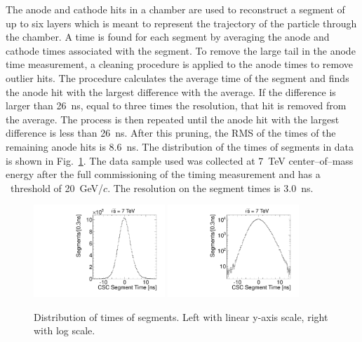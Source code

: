 The anode and cathode hits in a chamber are used to reconstruct a segment of up to six layers which is meant to represent the trajectory of the particle through the chamber.
A time is found for each segment by averaging the anode and cathode times associated with the segment. 
To remove the large tail in the anode time measurement,
a cleaning procedure is applied to the anode times to remove outlier hits. The procedure calculates the average time of the segment and finds the anode hit with the largest
difference with the average. If the difference is larger than 26~ns, equal to three times the resolution,
that hit is removed from the average. The process is then repeated until the
anode hit with the largest difference is less than 26~ns.
After this pruning, the RMS of the times of the remaining anode hits is 8.6~ns.
The distribution of the times of segments in data is shown in Fig.~\ref{fig:SegTimes}. 
The data sample used was collected at 7~TeV center--of--mass energy after the full commissioning of the timing measurement and has a \pt\ threshold of 20~GeV/$c$.
The resolution on the segment times is 3.0~ns.

\begin{figure}
  \begin{center}
      \includegraphics[width=0.44\textwidth]{figures/timing/StripAndWireSegmentTime}
      \includegraphics[width=0.44\textwidth]{figures/timing/StripAndWireSegmentTimeLog}
      \caption[Distribution of times of segments.]
      {Distribution of times of segments. Left with linear y-axis scale, right with log scale.
        }
      \label{fig:SegTimes}
  \end{center}
\end{figure}

